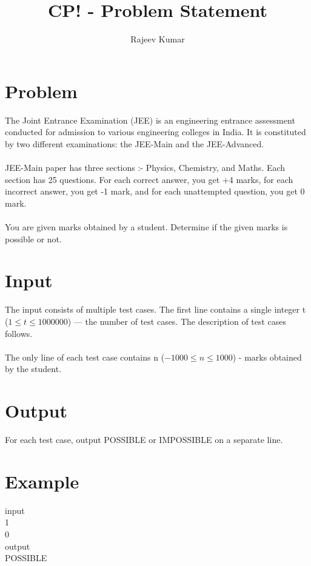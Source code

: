 \documentclass{article}
\title{CP! - Problem Statement}
\author{Rajeev Kumar}
\date{}
\begin{document}
\maketitle
\section*{Problem}
The Joint Entrance Examination (JEE) is an engineering entrance assessment conducted for admission to various engineering colleges in India. It is constituted by two different examinations: the JEE-Main and the JEE-Advanced.\\\\
JEE-Main paper has three sections :- Physics, Chemistry, and Maths. Each section has 25 questions. For each correct answer, you get +4 marks, for each incorrect answer, you get -1 mark, and for each unattempted question, you get 0 mark.\\\\
You are given marks obtained by a student. Determine if the given marks is possible or not.
\section*{Input}
The input consists of multiple test cases. The first line contains a single integer t ($1 \leq t \leq 1000000$) — the number of test cases. The description of test cases follows.\\\\
The only line of each test case contains n ($-1000 \leq n \leq 1000$) - marks obtained by the student.
\section*{Output}
For each test case, output POSSIBLE or IMPOSSIBLE on a separate line.
\section*{Example}
input\\
1\\
0\\
output\\
POSSIBLE\\
\end{document}

